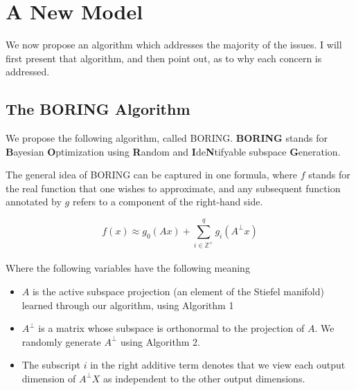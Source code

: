 \chapter{A New Model}

\ifpdf
    \graphicspath{{Chapter4/Figs/Raster/}{Chapter4/Figs/PDF/}{Chapter4/Figs/}}
\else
    \graphicspath{{Chapter4/Figs/Vector/}{Chapter4/Figs/}}
\fi

We now propose an algorithm which addresses the majority of the issues.
I will first present that algorithm, and then point out, as to why each concern is addressed.

\section{The BORING Algorithm}

We propose the following algorithm, called BORING. \textbf{BORING} stands for \textbf{B}ayesian \textbf{O}ptimization using \textbf{R}andom and \textbf{I}de\textbf{N}tifyable subspace \textbf{G}eneration.

The general idea of BORING can be captured in one formula, where $f$ stands for the real function that one wishes to approximate, and any subsequent function annotated by $g$ refers to a component of the right-hand side.

\begin{equation}
f(x) \approx g_0(A x) + \sum_{i \in \mathbb{Z}^+}^{q} g_i( A^{\bot} x )
\label{eq:dimRedEquation}
\end{equation} \\

Where the following variables have the following meaning
\begin{itemize}
\item $A$ is the active subspace projection (an element of the Stiefel manifold) learned through our algorithm, using Algorithm 1
\item $A^{\bot}$ is a matrix whose subspace is orthonormal to the projection of $A$.
We randomly generate $A^{\bot}$ using Algorithm 2.
\item The subscript $i$ in the right additive term denotes that we view each output dimension of $A^{\bot} X$ as independent to the other output dimensions.

\end{itemize}

